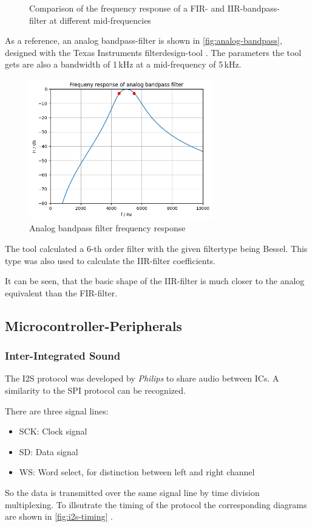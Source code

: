 \begin{figure}[!h]
\begin{subfigure}[c]{0.49\textwidth}
    \end{subfigure}
    \caption{Comparison of the frequency response of a \ac{FIR}- and \ac{IIR}-bandpass-filter at different mid-frequencies}
    \label{fig:fir-iir-dif_freq-compare}
\end{figure}

As a reference, an analog bandpass-filter is shown in \autoref{fig:analog-bandpass}, designed with the Texas Instruments
filterdesign-tool \cite{TI-filterdesign-tool}.
The parameters the tool gets are also a bandwidth of 1\,kHz at a mid-frequency of 5\,kHz.

\begin{figure}[!h]
    \centering
    \includegraphics[width=8cm]{img/analog_bandpass_ti.png}
    \caption{Analog bandpass filter frequency response}
    \label{fig:analog-bandpass}
\end{figure}

The tool calculated a 6-th order filter with the given filtertype being \frqq Bessel\flqq. This type was also used to
calculate the \ac{IIR}-filter coefficients.

It can be seen, that the basic shape of the \ac{IIR}-filter is much closer to the analog equivalent than the
\ac{FIR}-filter.

\subsection{Microcontroller-Peripherals}

\subsubsection{Inter-Integrated Sound}

The \ac{I2S} protocol was developed by \textit{Philips} to share audio between \acp{IC}.
A similarity to the \ac{SPI} protocol can be recognized.

There are three signal lines:
\begin{itemize}
    \item SCK: Clock signal
    \item SD: Data signal
    \item WS: Word select, for distinction between left and right channel
\end{itemize}
So the data is transmitted over the same signal line by time division multiplexing. 
To illsutrate the timing of the protocol the corresponding diagrams are shown in \autoref{fig:i2s-timing} \cite{nxp_i2s}.

